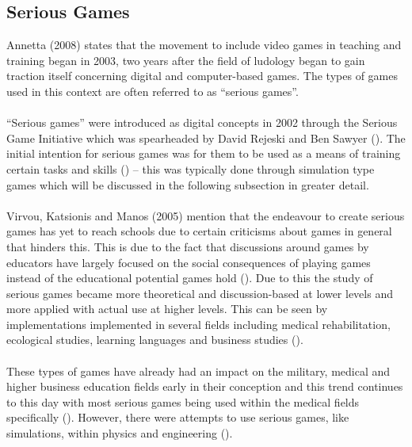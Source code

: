 \subsection{Serious Games}
Annetta (2008) states that the movement to include video games in teaching and training began in 2003, two years after the field of ludology began to gain traction itself concerning digital and computer-based games. The types of games used in this context are often referred to as “serious games”.  
\\\\
“Serious games” were introduced as digital concepts in 2002 through the Serious Game Initiative which was spearheaded by David Rejeski and Ben Sawyer (\cite{DeGloria2014}). The initial intention for serious games was for them to be used as a means of training certain tasks and skills (\cite{DeGloria2014}) – this was typically done through simulation type games which will be discussed in the following subsection in greater detail.
\\\\
Virvou, Katsionis and Manos (2005) mention that the endeavour to create serious games has yet to reach schools due to certain criticisms about games in general that hinders this. This is due to the fact that discussions around games by educators have largely focused on the social consequences of playing games instead of the educational potential games hold (\cite{Squire2003}). Due to this the study of serious games became more theoretical and discussion-based at lower levels and more applied with actual use at higher levels. This can be seen by implementations implemented in several fields including medical rehabilitation, ecological studies, learning languages and business studies (\cite{Burke2009, Costanza2014, Ranalli2008, Tao2009}). 
\\\\
These types of games have already had an impact on the military, medical and higher business education fields early in their conception and this trend continues to this day with most serious games being used within the medical fields specifically (\cite{Annetta2008, DeGloria2014}). However, there were attempts to use serious games, like simulations, within physics and engineering (\cite{Deshpande2011}).


